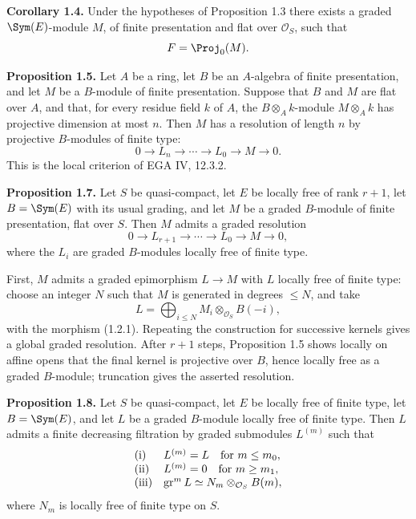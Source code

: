\documentclass[11pt]{article}
\begin{document}
\textbf{Corollary 1.4.} Under the hypotheses of Proposition 1.3 there exists a graded \(\Sym(E)\)-module \(M\), of finite presentation and flat over \(\mathcal O_S\), such that
\[
  F=\Proj_0(M).
\]

\textbf{Proposition 1.5.} Let \(A\) be a ring, let \(B\) be an \(A\)-algebra of finite presentation, and let \(M\) be a \(B\)-module of finite presentation. Suppose that \(B\) and \(M\) are flat over \(A\), and that, for every residue field \(k\) of \(A\), the \(B\otimes_A k\)-module \(M\otimes_A k\) has projective dimension at most \(n\). Then \(M\) has a resolution of length \(n\) by projective \(B\)-modules of finite type:
\[
  0\longrightarrow L_n\longrightarrow\cdots\longrightarrow L_0\longrightarrow M\longrightarrow 0.
\]
This is the local criterion of EGA IV, 12.3.2.

\textbf{Proposition 1.7.} Let \(S\) be quasi-compact, let \(E\) be locally free of rank \(r+1\), let \(B=\Sym(E)\) with its usual grading, and let \(M\) be a graded \(B\)-module of finite presentation, flat over \(S\). Then \(M\) admits a graded resolution
\[
  0\longrightarrow L_{r+1}\longrightarrow\cdots\longrightarrow L_0\longrightarrow M\longrightarrow 0,
\]
where the \(L_i\) are graded \(B\)-modules locally free of finite type.

First, \(M\) admits a graded epimorphism \(L\to M\) with \(L\) locally free of finite type: choose an integer \(N\) such that \(M\) is generated in degrees \(\leq N\), and take
\[
  L=\bigoplus_{i\leq N} M_i\otimes_{\mathcal O_S} B(-i),
\]
with the morphism (1.2.1). Repeating the construction for successive kernels gives a global graded resolution. After \(r+1\) steps, Proposition 1.5 shows locally on affine opens that the final kernel is projective over \(B\), hence locally free as a graded \(B\)-module; truncation gives the asserted resolution.

\textbf{Proposition 1.8.} Let \(S\) be quasi-compact, let \(E\) be locally free of finite type, let \(B=\Sym(E)\), and let \(L\) be a graded \(B\)-module locally free of finite type. Then \(L\) admits a finite decreasing filtration by graded submodules \(L^{(m)}\) such that
\[
\begin{array}{ll}
\text{\rm (i)}& L^{(m)}=L\quad\text{for }m\leq m_0,\\
\text{\rm (ii)}& L^{(m)}=0\quad\text{for }m\geq m_1,\\
\text{\rm (iii)}& \operatorname{gr}^m L
  \simeq N_m\otimes_{\mathcal O_S}B(m),
\end{array}
\]
where \(N_m\) is locally free of finite type on \(S\).
\end{document}

